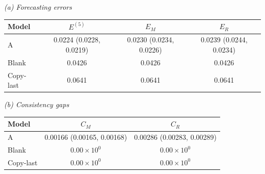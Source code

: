 {\small\textit{(a) Forecasting errors}}\par\vspace{2pt}
\par\begingroup\centering\fontsize{8.5}{10.5}\selectfont\setlength{\parskip}{0pt}\setlength{\tabcolsep}{4pt}
\begin{tabular}{@{}lccc@{}}
\toprule
Model & $E^{(5)}$ & $E_M$ & $E_R$ \\
\midrule
A & 0.0224 (0.0228, 0.0219) & 0.0230 (0.0234, 0.0226) & 0.0239 (0.0244, 0.0234) \\
Blank & 0.0426 & 0.0426 & 0.0426 \\
Copy-last & 0.0641 & 0.0641 & 0.0641 \\
\bottomrule
\end{tabular}\par\endgroup\vspace{5pt}
{\small\textit{(b) Consistency gaps}}\par\vspace{2pt}
\par\begingroup\centering\fontsize{8.5}{10.5}\selectfont\setlength{\parskip}{0pt}\setlength{\tabcolsep}{4pt}
\begin{tabular}{@{}lcc@{}}
\toprule
Model & $C_M$ & $C_R$ \\
\midrule
A & 0.00166 (0.00165, 0.00168) & 0.00286 (0.00283, 0.00289) \\
Blank & $0.00\!\times\!10^{0}$ & $0.00\!\times\!10^{0}$ \\
Copy-last & $0.00\!\times\!10^{0}$ & $0.00\!\times\!10^{0}$ \\
\bottomrule
\end{tabular}\par\endgroup\vspace{5pt}
